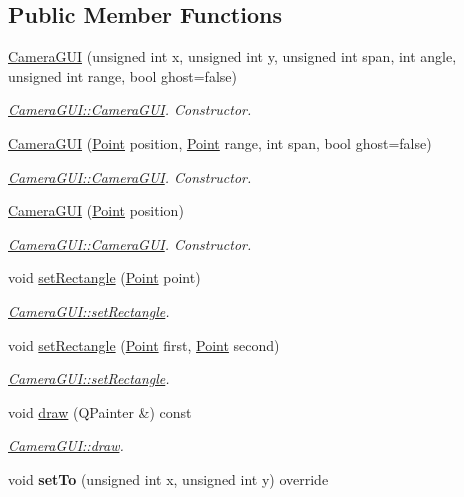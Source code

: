 \subsection*{Public Member Functions}
\begin{DoxyCompactItemize}
\item 
\hyperlink{classCameraGUI_a076ea3f14aace383a31d4cd835310a49}{Camera\-G\-U\-I} (unsigned int x, unsigned int y, unsigned int span, int angle, unsigned int range, bool ghost=false)
\begin{DoxyCompactList}\small\item\em \hyperlink{classCameraGUI_a076ea3f14aace383a31d4cd835310a49}{Camera\-G\-U\-I\-::\-Camera\-G\-U\-I}. Constructor. \end{DoxyCompactList}\item 
\hyperlink{classCameraGUI_a847265abc60ee2011e460e20f8e17930}{Camera\-G\-U\-I} (\hyperlink{classPoint}{Point} position, \hyperlink{classPoint}{Point} range, int span, bool ghost=false)
\begin{DoxyCompactList}\small\item\em \hyperlink{classCameraGUI_a076ea3f14aace383a31d4cd835310a49}{Camera\-G\-U\-I\-::\-Camera\-G\-U\-I}. Constructor. \end{DoxyCompactList}\item 
\hyperlink{classCameraGUI_aee52d51f94af00b5f70673d36bb7f8df}{Camera\-G\-U\-I} (\hyperlink{classPoint}{Point} position)
\begin{DoxyCompactList}\small\item\em \hyperlink{classCameraGUI_a076ea3f14aace383a31d4cd835310a49}{Camera\-G\-U\-I\-::\-Camera\-G\-U\-I}. Constructor. \end{DoxyCompactList}\item 
void \hyperlink{classCameraGUI_ac2f1343cecf2469c4112bc3efe122b1f}{set\-Rectangle} (\hyperlink{classPoint}{Point} point)
\begin{DoxyCompactList}\small\item\em \hyperlink{classCameraGUI_ac2f1343cecf2469c4112bc3efe122b1f}{Camera\-G\-U\-I\-::set\-Rectangle}. \end{DoxyCompactList}\item 
void \hyperlink{classCameraGUI_a9c7dedccd547b24aeea2275b81964dd5}{set\-Rectangle} (\hyperlink{classPoint}{Point} first, \hyperlink{classPoint}{Point} second)
\begin{DoxyCompactList}\small\item\em \hyperlink{classCameraGUI_ac2f1343cecf2469c4112bc3efe122b1f}{Camera\-G\-U\-I\-::set\-Rectangle}. \end{DoxyCompactList}\item 
void \hyperlink{classCameraGUI_a56c36908fcf541131711a96be0d19bf2}{draw} (Q\-Painter \&) const 
\begin{DoxyCompactList}\small\item\em \hyperlink{classCameraGUI_a56c36908fcf541131711a96be0d19bf2}{Camera\-G\-U\-I\-::draw}. \end{DoxyCompactList}\item 
\hypertarget{classCameraGUI_a70a05a7d985c73ddc47f4967c4b7de19}{void {\bfseries set\-To} (unsigned int x, unsigned int y) override}\label{classCameraGUI_a70a05a7d985c73ddc47f4967c4b7de19}


\end{DoxyCompactItemize}
